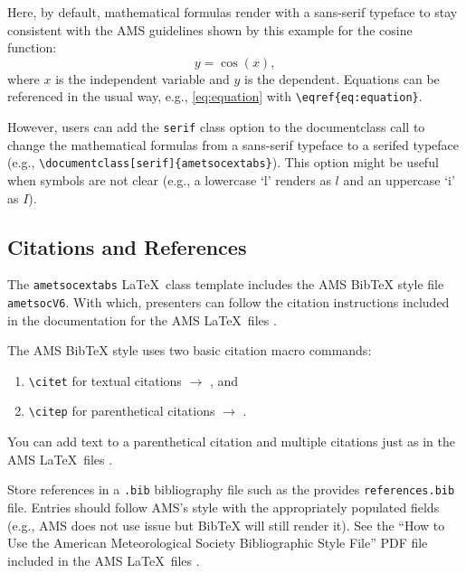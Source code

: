 \documentclass[9pt, blue]{ametsocextabs}
\begin{document}
Here, by default, mathematical formulas render with a sans-serif
typeface to stay consistent with the AMS guidelines shown by this
example for the cosine function:
\begin{equation}
    y = \cos (x),
    \label{eq:equation}
\end{equation}
where $x$ is the independent variable and $y$ is the dependent.
Equations can be referenced in the usual way, e.g.,
\eqref{eq:equation} with \texttt{\textbackslash eqref\{eq:equation\}}.


However, users can add the \texttt{serif} class option to the
documentclass call to change the mathematical formulas from a
sans-serif typeface to a serifed typeface (e.g.,
\texttt{\textbackslash documentclass[serif]\{ametsocextabs\}}). This
option might be useful when symbols are not clear (e.g., a lowercase
`l' renders as $l$ and an uppercase `i' as $I$).

\subsection{Citations and References}
The \lowercase{\texttt{ametsocextabs}} \LaTeX\ class template
includes the AMS BibTeX style file \texttt{ametsocV6}. With which,
presenters can follow the citation instructions included in the
documentation for the AMS \LaTeX\ files \cite{AMS2025latex, AMS2025doc}.

The AMS BibTeX style uses two basic citation macro commands:
\begin{enumerate}
    \item \texttt{\textbackslash citet} for textual citations $\rightarrow$ \citet{Eliassen1951}, and
    \item \texttt{\textbackslash citep} for parenthetical citations  $\rightarrow$ \citep{Eliassen1951}.
\end{enumerate}
You can add text to a parenthetical citation and multiple
citations just as in the AMS \LaTeX\ files
\citep[e.g.,][]{Eliassen1951,AMS2025latex, AMS2025doc}.

Store references in a \texttt{.bib} bibliography file such as the
provides \texttt{references.bib} file. Entries should follow AMS's
style with the appropriately populated fields (e.g., AMS does not
use issue but BibTeX will still render it). See the ``How to Use the
American Meteorological Society Bibliographic Style File'' PDF file
included in the AMS \LaTeX\ files \cite{AMS2025latex, AMS2025doc}.
\end{document}
